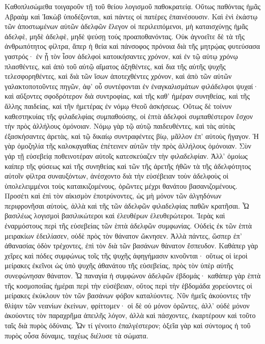 Καθοπλισώμεθα τοιγαροῦν τῇ τοῦ θείου λογισμοῦ παθοκρατείᾳ. 
Οὕτως παθόντας ἡμᾶς Αβραὰμ καὶ Ἰακὼβ ὑποδέξονται, καὶ πάντες οἱ πατέρες ἐπαινέσουσιν. 
Καὶ ἑνὶ ἑκάστῳ τῶν ἀποστωμένων αὐτῶν ἀδελφῶν ἔλεγον οἱ περιλειπόμενοι, μὴ καταισχύνῃς ἡμᾶς ἀδελφὲ, μηδὲ ἀδελφὲ, μηδὲ ψεύσῃ τούς προαποθανόντας. 
Οὐκ ἀγνοεῖτε δὲ τὰ τῆς ἀνθρωπότητος φίλτρα, ἅπερ ἡ θεία καὶ πάνσοφος πρόνοια διὰ τῆς μητρῴας φυτεύσασα γαστρός· 
ἐν ᾗ τὸν ἶσον ἀδελφοὶ κατοικήσαντες χρόνον, καὶ ἐν τῷ αὐτῳ χρόνῳ πλασθέντες, καὶ ἀπὸ τοῦ αὐτῷ αἵματος ἀξηθέντες, καὶ δια τῆς αὐτῆς ψυχῆς τελεσφορηθέντες, 
καὶ διὰ τῶν ἴσων ἀποτεχθέντες χρόνον, καὶ ἀπὸ τῶν αὐτῶν γαλακτοποτοῦντες πηγῶν, ἀφ' οὗ συντέφονται ἐν ἐναγκαλισμάτων φιλάδελφοι ψυχαί· 
καὶ αὔξοντες σφοδρότερον διὰ συντροφίας, καὶ τῆς καθ' ἠμέραν συνηθείας, καὶ τῆς ἄλλης παιδείας, καὶ τῆν ἡμετέρας ἐν νόμῳ Θεοῦ ἀσκήσεως. 
Οὕτως δὲ τοίνυν καθεστηκυίας τῆς φιλαδελφίας συμπαθούσης, οἱ ἑπτὰ ἀδελφοὶ συμπαθέστερον ἔσχον τὴν πρὸς ἀλλήλους ὁμόνοιαν. 
Νόμῳ γὰρ τῷ αὐτῷ παιδευθέντες, καὶ τὰς αὐτὰς ἐξασκήσαντες ἀρετὰς, καὶ τῷ δικαίῳ συντραφέντες βίῳ, μᾶλλον ἐπ' αὐτοὺς ἥγαγον. 
Ἡ γὰρ ὁμοζηλία τῆς καλοκᾳγαθίας ἐπέτεινεν αὐτῶν τὴν πρὸς ἀλλήλους ὁμόνοιαν. 
Σὺν γάρ τῇ εὐσεβείᾳ ποθεινοτέραν αὐτοῖς κατεσκεύαζεν τὴν φιλαδελφίαν. 
Ἀλλ' ὁμοίως καίπερ τῆς φύσεως καὶ τῆς συνηθείας καὶ τῶν τῆς ἀρετῆς ἠθῶν τὰ τῆς ἀδελφότητος αὐτοῖν φίλτρα συναυξόντων, ἀνέσχοντο διὰ τὴν εὐσέβειαν τοὺν ἀδελφοὺς οἱ ὑπολελειμμένοι τοὺς καταικιζομένους, ὁρῶντες μέχρι θανάτου βασανιζομένους. 
Προσέτι καὶ ἐπὶ τὸν αἰκισμὸν ἐποτρύνοντες, ὡς μὴ μόνον τῶν ἀλγηδόνων περιφρονῆσαι αὐτοὺς, ἀλλὰ καὶ τῆς τῶν ἀδελφῶν φιλαδελφίας παθῶν κρατῆσαι. 
Ὦ βασιλέως λογισμοὶ βασιλικώτεροι καὶ ἐλευθέρων ἐλευθερώτεροι. 
Ἱερὰς καὶ ἐναρμόστους περὶ τῆς εὐσεβείας τῶν ἑπτὰ ἀδελφῶν συμφωνίας. 
Οὐδεὶς ἐκ τῶν ἑπτὰ μειρακίων ἐδειλίασεν, οὐδὲ πρὸς τὸν θάνατον ὤκνησεν. 
Ἀλλὰ πάντες, ὥσπερ ἐπ' ἀθανασίας ὁδὸν τρέχοντες, ἐπὶ τὸν διὰ τῶν βασάνων θάνατον ἔσπευδον. 
Καθάπερ γὰρ χεῖρες καὶ πόδες συμφώνως τοῖς τῆς ψυχῆς ἀφηγήμασιν κινοῦνται· οὕτως οἱ ἱεροὶ μείρακες ἐκεῖνοι ὡς ὑπὸ ψυχῆς ἀθανάτου τῆς εὐσεβείας, πρὸς τὸν ὑπὲρ αὐτῆς συνεφώνησαν θάνατον. 
Ὦ παναγία ἡ συμφώνον ἀδελφῶν ἐβδομάς· καθάπερ γὰρ ἑπτὰ τῆς κοσμοποιΐας ἡμέραι περὶ τὴν εὐσέβειαν, 
οὕτος περὶ τὴν ἑβδομάδα χορεύοντες οἱ μείρακες ἐκύκλουν τὸν τῶν βασάνων φόβον καταλύοντες. 
Νῦν ἡμεῖς ἀκούοντες τῆν θλίψιν τῶν νεανίων ἐκείνων, φρίττομεν· οἱ δὲ οὐ μόνον ὁρῶντες, ἀλλ' οὐδὲ μόνον ἀκούοντες τὸν παραχρῆμα ἀπειλῆς λόγον, ἀλλὰ καὶ πάσχοντες, ἐκαρτέρουν καὶ τοῦτο ταῖς διὰ πυρὸς ὀδύναις. 
Ὧν τί γένοιτο ἐπαλγέστερον; ὀξεῖα γὰρ καὶ σύντομος ἡ τοῦ πυρὸς οὖσα δύναμις, ταχέως διέλυσε τὰ σώματα. 
